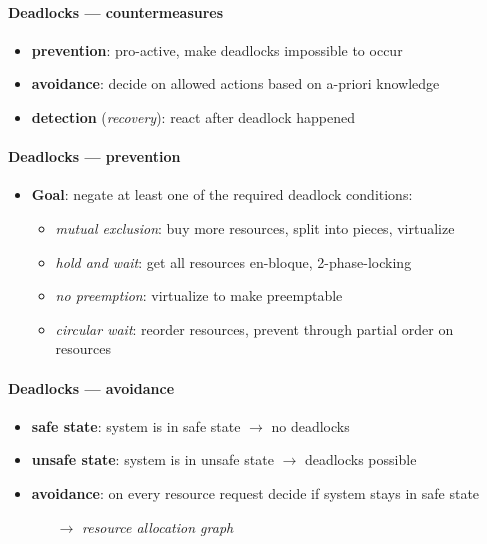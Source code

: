 \paragraph{Deadlocks --- countermeasures}
\begin{itemize}
  \item \textbf{prevention}: pro-active, make deadlocks impossible to occur
  \item \textbf{avoidance}: decide on allowed actions based on a-priori knowledge
  \item \textbf{detection} (\emph{recovery}): react after deadlock happened
\end{itemize}

\paragraph{Deadlocks --- prevention}
\begin{itemize}
  \item \textbf{Goal}: negate at least one of the required deadlock conditions:
  \begin{itemize}
    \item \emph{mutual exclusion}: buy more resources, split into pieces, virtualize
    \item \emph{hold and wait}: get all resources en-bloque, 2-phase-locking
    \item \emph{no preemption}: virtualize to make preemptable
    \item \emph{circular wait}: reorder resources, prevent through partial order on resources
  \end{itemize}
\end{itemize}

\paragraph{Deadlocks --- avoidance}
\begin{itemize}
  \item \textbf{safe state}: system is in safe state $ \to $ no deadlocks
  \item \textbf{unsafe state}: system is in unsafe state $ \to $ deadlocks possible
  \item \textbf{avoidance}: on every resource request decide if system stays in safe state
  \begin{itemize}
    \item[$ \to $] \emph{resource allocation graph}
  \end{itemize}
\end{itemize}

